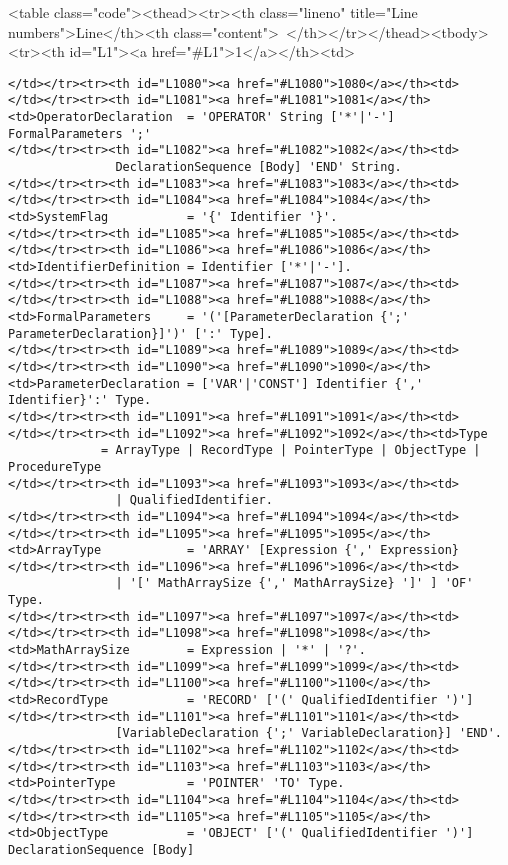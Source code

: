 <table class="code"><thead><tr><th class="lineno" title="Line numbers">Line</th><th class="content"> </th></tr></thead><tbody><tr><th id="L1"><a href="#L1">1</a></th><td>\documentclass[a4paper,11pt]{article}
\begin{document}
\begin{lstlisting}[language = EBNF, frame=none,xleftmargin=0mm]
</td></tr><tr><th id="L1080"><a href="#L1080">1080</a></th><td>
</td></tr><tr><th id="L1081"><a href="#L1081">1081</a></th><td>OperatorDeclaration  = 'OPERATOR' String ['*'|'-'] FormalParameters ';'
</td></tr><tr><th id="L1082"><a href="#L1082">1082</a></th><td>                       DeclarationSequence [Body] 'END' String.
</td></tr><tr><th id="L1083"><a href="#L1083">1083</a></th><td>
</td></tr><tr><th id="L1084"><a href="#L1084">1084</a></th><td>SystemFlag           = '{' Identifier '}'.
</td></tr><tr><th id="L1085"><a href="#L1085">1085</a></th><td>
</td></tr><tr><th id="L1086"><a href="#L1086">1086</a></th><td>IdentifierDefinition = Identifier ['*'|'-'].
</td></tr><tr><th id="L1087"><a href="#L1087">1087</a></th><td>
</td></tr><tr><th id="L1088"><a href="#L1088">1088</a></th><td>FormalParameters     = '('[ParameterDeclaration {';' ParameterDeclaration}]')' [':' Type].
</td></tr><tr><th id="L1089"><a href="#L1089">1089</a></th><td>
</td></tr><tr><th id="L1090"><a href="#L1090">1090</a></th><td>ParameterDeclaration = ['VAR'|'CONST'] Identifier {',' Identifier}':' Type.
</td></tr><tr><th id="L1091"><a href="#L1091">1091</a></th><td>
</td></tr><tr><th id="L1092"><a href="#L1092">1092</a></th><td>Type                 = ArrayType | RecordType | PointerType | ObjectType | ProcedureType
</td></tr><tr><th id="L1093"><a href="#L1093">1093</a></th><td>                       | QualifiedIdentifier.
</td></tr><tr><th id="L1094"><a href="#L1094">1094</a></th><td>
</td></tr><tr><th id="L1095"><a href="#L1095">1095</a></th><td>ArrayType            = 'ARRAY' [Expression {',' Expression}
</td></tr><tr><th id="L1096"><a href="#L1096">1096</a></th><td>                       | '[' MathArraySize {',' MathArraySize} ']' ] 'OF' Type.
</td></tr><tr><th id="L1097"><a href="#L1097">1097</a></th><td>
</td></tr><tr><th id="L1098"><a href="#L1098">1098</a></th><td>MathArraySize        = Expression | '*' | '?'.
</td></tr><tr><th id="L1099"><a href="#L1099">1099</a></th><td>
</td></tr><tr><th id="L1100"><a href="#L1100">1100</a></th><td>RecordType           = 'RECORD' ['(' QualifiedIdentifier ')']
</td></tr><tr><th id="L1101"><a href="#L1101">1101</a></th><td>                       [VariableDeclaration {';' VariableDeclaration}] 'END'.
</td></tr><tr><th id="L1102"><a href="#L1102">1102</a></th><td>
</td></tr><tr><th id="L1103"><a href="#L1103">1103</a></th><td>PointerType          = 'POINTER' 'TO' Type.
</td></tr><tr><th id="L1104"><a href="#L1104">1104</a></th><td>
</td></tr><tr><th id="L1105"><a href="#L1105">1105</a></th><td>ObjectType           = 'OBJECT' ['(' QualifiedIdentifier ')'] DeclarationSequence [Body]

\end{lstlisting}
\end{document}
